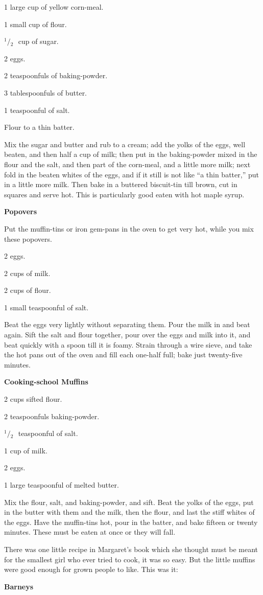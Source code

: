 \documentclass[11pt]{book}
\newcommand{\indpar}{\par\noindent\hspace*{\parindent}}
\newcommand{\ingredient}{\indpar}
\newcommand{\instruction}{\indpar}
\newcommand{\OneHalf}{\ensuremath{{}^1\!\!/\!{}_2\mbox{\ }}}
\newenvironment{RecipeTitle}{\medskip\begin{center}\large\bf }{\end{center}\smallskip}
\begin{document}
\ingredient  1 large cup of yellow corn-meal.
\ingredient  1 small cup of flour.
\ingredient  \OneHalf cup of sugar.
\ingredient  2 eggs.
\ingredient  2 teaspoonfuls of baking-powder.
\ingredient  3 tablespoonfuls of butter.
\ingredient  1 teaspoonful of salt.
\ingredient  Flour to a thin batter.
\instruction
  Mix the sugar and butter and rub to a cream; add the yolks
of the eggs, well beaten, and then half a cup of milk; then put
in the baking-powder mixed in the flour and the salt, and then
part of the corn-meal, and a little more milk; next fold in
the beaten whites of the eggs, and if it still is not like
``a thin batter,'' put in a little more milk.  Then bake in a
buttered biscuit-tin till brown, cut in squares and serve hot.
This is particularly good eaten with hot maple syrup.
\begin{RecipeTitle}
Popovers\label{popovers}
\end{RecipeTitle}
\instruction
  Put the muffin-tins or iron gem-pans in the oven to get
very hot, while you mix these popovers.
\ingredient  2 eggs.
\ingredient  2 cups of milk.
\ingredient  2 cups of flour.
\ingredient  1 small teaspoonful of salt.
\instruction
  Beat the eggs very lightly without separating them.  Pour the
milk in and beat again.  Sift the salt and flour together, pour
over the eggs and milk into it, and beat quickly with a spoon
till it is foamy.  Strain through a wire sieve, and take the hot
pans out of the oven and fill each one-half full; bake just
twenty-five minutes.
\begin{RecipeTitle}
Cooking-school Muffins\label{cooking_school_muffins}
\end{RecipeTitle}
\ingredient  2 cups sifted flour.
\ingredient  2 teaspoonfuls baking-powder.
\ingredient  \OneHalf teaspoonful of salt.
\ingredient  1 cup of milk.
\ingredient  2 eggs.
\ingredient  1 large teaspoonful of melted butter.
\instruction
  Mix the flour, salt, and baking-powder, and sift.  Beat the
yolks of the eggs, put in the butter with them and the milk,
then the flour, and last the stiff whites of the eggs.  Have
the muffin-tins hot, pour in the batter, and bake fifteen or
twenty minutes.  These must be eaten at once or they will fall.
\medskip
\indpar
  There was one little recipe in Margaret's book which she
thought must be meant for the smallest girl who ever tried
to cook, it was so easy.  But the little muffins were good
enough for grown people to like.  This was it:
\begin{RecipeTitle}
Barneys\label{barneys}
\end{RecipeTitle}
\end{document}
